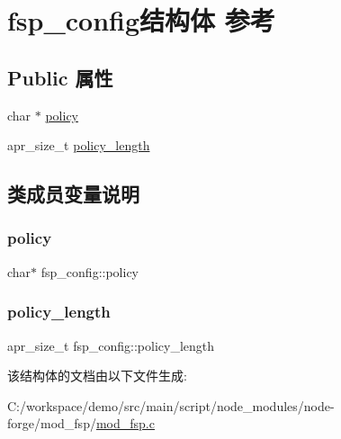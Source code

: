 \hypertarget{structfsp__config}{}\section{fsp\+\_\+config结构体 参考}
\label{structfsp__config}
\subsection*{Public 属性}
\begin{DoxyCompactItemize}
\item 
char $\ast$ \mbox{\hyperlink{structfsp__config_a2ccb77a9fdf175a457b07685dd472e0f}{policy}}
\item 
apr\+\_\+size\+\_\+t \mbox{\hyperlink{structfsp__config_a17e23ff5b5377a17691ccc7b9ae855b4}{policy\+\_\+length}}
\end{DoxyCompactItemize}


\subsection{类成员变量说明}
\mbox{\label{structfsp__config_a2ccb77a9fdf175a457b07685dd472e0f}} 
\subsubsection{\texorpdfstring{policy}{policy}}
{\footnotesize\ttfamily char$\ast$ fsp\+\_\+config\+::policy}

\mbox{\label{structfsp__config_a17e23ff5b5377a17691ccc7b9ae855b4}} 
\subsubsection{\texorpdfstring{policy\+\_\+length}{policy\_length}}
{\footnotesize\ttfamily apr\+\_\+size\+\_\+t fsp\+\_\+config\+::policy\+\_\+length}



该结构体的文档由以下文件生成\+:\begin{DoxyCompactItemize}
\item 
C\+:/workspace/demo/src/main/script/node\+\_\+modules/node-\/forge/mod\+\_\+fsp/\mbox{\hyperlink{mod__fsp_8c}{mod\+\_\+fsp.\+c}}\end{DoxyCompactItemize}
